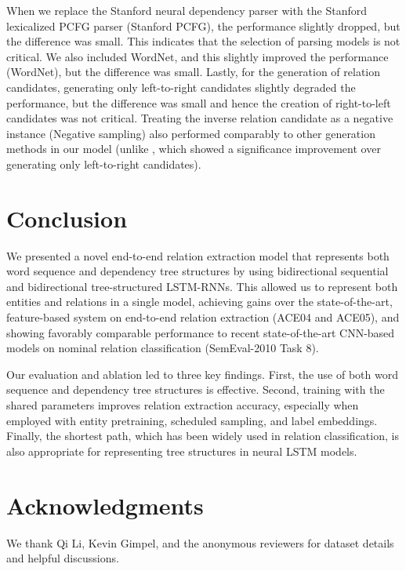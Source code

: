 \documentclass[11pt]{article}
\begin{document}
When we replace the Stanford neural dependency parser with the Stanford lexicalized PCFG parser (Stanford PCFG), the performance slightly dropped, but the difference was small. 
This indicates that the selection of parsing models is not critical.
We also included WordNet, and this slightly improved the performance (WordNet), but the difference was small.
Lastly, for the generation of relation candidates, generating only left-to-right
candidates slightly degraded the performance, 
but the difference was small and hence the creation of right-to-left candidates was not critical. 
Treating the inverse relation candidate as a negative instance (Negative sampling) also performed comparably to other generation methods in our model (unlike , which showed a significance improvement over generating only left-to-right candidates). 

\section{Conclusion}

We presented a novel end-to-end relation extraction model that represents both word sequence and dependency tree structures by using bidirectional sequential and bidirectional tree-structured LSTM-RNNs. This allowed us to represent both entities and relations in a single model, achieving gains over the state-of-the-art, feature-based system on end-to-end relation extraction (ACE04 and ACE05), and showing favorably comparable performance to recent state-of-the-art CNN-based models on nominal relation classification (SemEval-2010 Task 8).  

Our evaluation and ablation led to three key findings.
First, the use of both word sequence and dependency tree structures is effective. 
Second, training with the shared parameters improves relation extraction accuracy, 
especially when employed with entity pretraining, scheduled sampling, and label embeddings. 
Finally, the shortest path, which has been widely used in relation classification, is also appropriate for representing tree structures in neural LSTM models.
 
\section*{Acknowledgments}
We thank Qi Li, Kevin Gimpel, and the anonymous reviewers for dataset details and helpful discussions.



\end{document}
